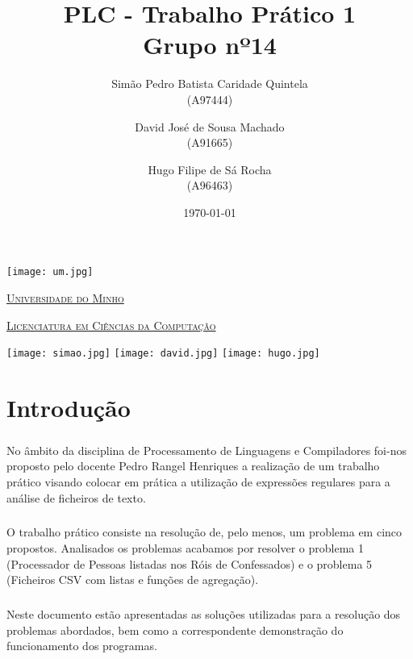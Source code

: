 \documentclass[11pt,a4paper]{report}
\title{PLC - Trabalho Prático 1\\
	\large Grupo nº14}
\author{Simão Pedro Batista Caridade Quintela \\ (A97444) 
        \and David José de Sousa Machado \\ (A91665)
        \and Hugo Filipe de Sá Rocha \\ (A96463)
       } %
\date{\today} %
\begin{document}
	\begin{minipage}{0.9\linewidth}
        \centering
		\texttt{[image: um.jpg]}\par\vspace{1 cm}
		\href{https://www.uminho.pt/PT}
		{\scshape\LARGE Universidade do Minho} \par
		\vspace{0.6cm}
		\href{https://lcc.di.uminho.pt}
		{\scshape\Large Licenciatura em Ciências da Computação} \par
		\maketitle
		
		\texttt{[image: simao.jpg]}
	    \texttt{[image: david.jpg]}	
        \texttt{[image: hugo.jpg]}
        
		
	\end{minipage}
	
	\tableofcontents
	
	\pagebreak
	
	\chapter{Introdução}
% 
    \paragraph{}
    No âmbito da disciplina de Processamento de Linguagens e Compiladores foi-nos proposto pelo docente Pedro Rangel Henriques a realização de um trabalho prático visando colocar em prática a utilização de expressões regulares para a análise de ficheiros de texto.

    \paragraph{}
    O trabalho prático consiste na resolução de, pelo menos, um problema em cinco propostos. Analisados os problemas acabamos por resolver o problema 1 (Processador de Pessoas listadas nos Róis de Confessados) e o problema 5 (Ficheiros CSV com listas e funções de agregação).

    \paragraph{}
    Neste documento estão apresentadas as soluções utilizadas para a resolução dos problemas abordados, bem como a correspondente demonstração do funcionamento dos programas. 
\end{document}

